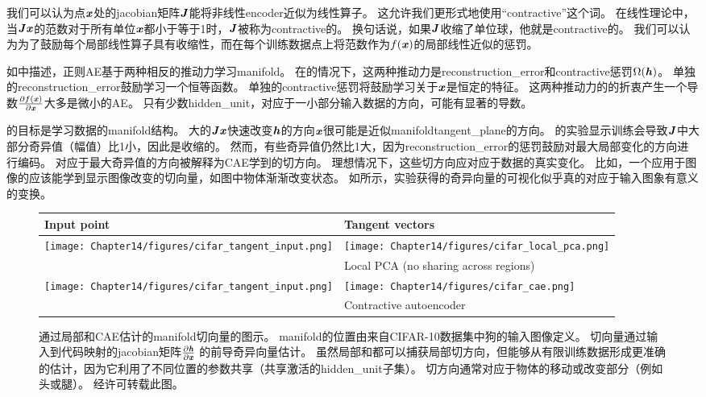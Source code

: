 我们可以认为点$\boldsymbol{\mathit{x}}$处的\gls{jacobian}矩阵$\boldsymbol{\mathit{J}}$能将非线性\gls{encoder}近似为线性算子。
这允许我们更形式地使用``\gls{contractive}''这个词。
在线性理论中，当$\boldsymbol{\mathit{J}}\boldsymbol{\mathit{x}}$的范数对于所有单位$\boldsymbol{\mathit{x}}$都小于等于1时，$\boldsymbol{\mathit{J}}$被称为\gls{contractive}的。
换句话说，如果$\boldsymbol{\mathit{J}}$收缩了单位球，他就是\gls{contractive}的。
我们可以认为为了鼓励每个局部线性算子具有收缩性，而在每个训练数据点上将范数作为$f(\boldsymbol{\mathit{x}})$的局部线性近似的惩罚。


如中描述，正则\gls{AE}基于两种相反的推动力学习\gls{manifold}。
在的情况下，这两种推动力是\gls{reconstruction_error}和\gls{contractive}惩罚$\Omega(\boldsymbol{\mathit{h}})$。
单独的\gls{reconstruction_error}鼓励学习一个恒等函数。
单独的\gls{contractive}惩罚将鼓励学习关于$\boldsymbol{\mathit{x}}$是恒定的特征。
这两种推动力的的折衷产生一个导数$\frac{\partial f(\boldsymbol{\mathit{x}})}{\partial \boldsymbol{\mathit{x}}}$大多是微小的\gls{AE}。
只有少数\gls{hidden_unit}，对应于一小部分输入数据的方向，可能有显著的导数。


的目标是学习数据的\gls{manifold}结构。
大的$\boldsymbol{\mathit{J}}\boldsymbol{\mathit{x}}$快速改变$\boldsymbol{\mathit{h}}$的方向$\boldsymbol{\mathit{x}}$很可能是近似\gls{manifold}\gls{tangent_plane}的方向。
\citet{Rifai+al-2011-small,Salah+al-2011-small}的实验显示训练会导致$\boldsymbol{\mathit{J}}$中大部分奇异值（幅值）比1小，因此是收缩的。
然而，有些奇异值仍然比1大，因为\gls{reconstruction_error}的惩罚鼓励对最大局部变化的方向进行编码。
对应于最大奇异值的方向被解释为\gls{CAE}学到的切方向。
理想情况下，这些切方向应对应于数据的真实变化。
比如，一个应用于图像的应该能学到显示图像改变的切向量，如图中物体渐渐改变状态。
如所示，实验获得的奇异向量的可视化似乎真的对应于输入图象有意义的变换。


\begin{figure}[ht]
\centering
\begin{tabular}{p{.1\figwidth}|p{.86\figwidth}}
Input point & Tangent vectors\\
\hline 
\texttt{[image: Chapter14/figures/cifar\_tangent\_input.png]} & 
\texttt{[image: Chapter14/figures/cifar\_local\_pca.png]}\\
 & Local PCA (no sharing across regions)\\
 \hline
\texttt{[image: Chapter14/figures/cifar\_tangent\_input.png]} & 
\texttt{[image: Chapter14/figures/cifar\_cae.png]}\\
 & Contractive autoencoder\\
\end{tabular}
\caption{通过局部和\gls{CAE}估计的\gls{manifold}切向量的图示。
\gls{manifold}的位置由来自CIFAR-10数据集中狗的输入图像定义。
切向量通过输入到代码映射的\gls{jacobian}矩阵$\frac{\partial \boldsymbol{\mathit{h}}}{\partial \boldsymbol{\mathit{x}}}$ 的前导奇异向量估计。
虽然局部和都可以捕获局部切方向，但能够从有限训练数据形成更准确的估计，因为它利用了不同位置的参数共享（共享激活的\gls{hidden_unit}子集）。
切方向通常对应于物体的移动或改变部分（例如头或腿）。
经\citet{Dauphin-et-al-NIPS2011-small}许可转载此图。
}
\label{fig:chap14_cifar_cae}
\end{figure}


